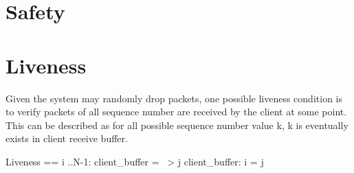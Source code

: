 \section{Safety}

\section{Liveness}

Given the system may randomly drop packets, one possible liveness condition is
to verify packets of all sequence number are received by the client at some
point. This can be described as for all possible sequence number value k, k is
eventually exists in client receive buffer.\\

\begin{tla}
Liveness == 
    \A i ..N-1:
        client_buffer = {} ~> \E j \in client_buffer: i = j 
\end{tla}
\begin{tlatex}
%
%
\end{tlatex}

% 
